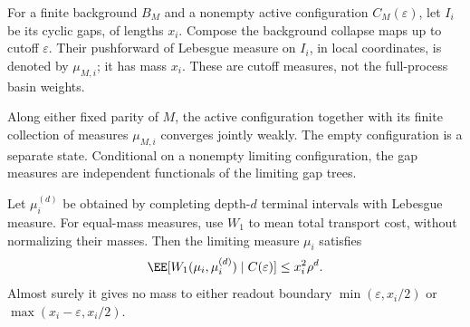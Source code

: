 \documentclass[11pt,letterpaper]{article}
\begin{document}
For a finite background $B_M$ and a nonempty active configuration
$C_M(\varepsilon)$, let $I_i$ be its cyclic gaps, of lengths $x_i$.
Compose the background collapse maps up to cutoff $\varepsilon$.
Their pushforward of Lebesgue measure on $I_i$, in local coordinates,
is denoted by $\mu_{M,i}$; it has mass $x_i$. These are cutoff measures,
not the full-process basin weights.

\begin{lemma}
\label{lem:gap-measure-limit}
Along either fixed parity of $M$, the active configuration together with
its finite collection of measures $\mu_{M,i}$ converges jointly weakly.
The empty configuration is a separate state. Conditional on a nonempty
limiting configuration, the gap measures are independent functionals of
the limiting gap trees.

Let $\mu_i^{(d)}$ be obtained by completing depth-$d$ terminal intervals
with Lebesgue measure. For equal-mass measures, use $W_1$ to mean total
transport cost, without normalizing their masses. Then the limiting
measure $\mu_i$ satisfies
\begin{equation}\label{eq:whole-gap-approximation}
 \EE[W_1(\mu_i,\mu_i^{(d)})\mid C(\varepsilon)]
       \le x_i^2\rho^d.
\end{equation}
Almost surely it gives no mass to either readout boundary
$\min(\varepsilon,x_i/2)$ or $\max(x_i-\varepsilon,x_i/2)$.
\end{lemma}
\end{document}
